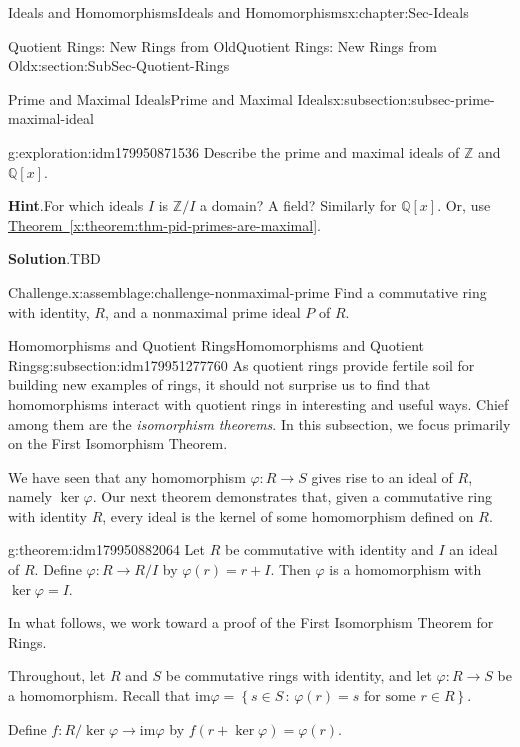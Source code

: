 \documentclass[oneside,10pt,]{book}
\newcommand{\blocktitlefont}{\relax}
\newcommand{\xreffont}{\relax}
\numberwithin{equation}{section}
\def\p{\varphi}
\def\im{\text{im}}
\newcommand{\setof}[2]{{\left\{#1\,\colon\,#2\right\}}}
\def\Z{{\mathbb Z}}
\def\Q{{\mathbb Q}}
\begin{document}
\begin{chapterptx}{Ideals and Homomorphisms}{}{Ideals and Homomorphisms}{}{}{x:chapter:Sec-Ideals}
\begin{sectionptx}{Quotient Rings: New Rings from Old}{}{Quotient Rings: New Rings from Old}{}{}{x:section:SubSec-Quotient-Rings}
\begin{subsectionptx}{Prime and Maximal Ideals}{}{Prime and Maximal Ideals}{}{}{x:subsection:subsec-prime-maximal-ideal}
\begin{exploration}{}{g:exploration:idm179950871536}
Describe the prime and maximal ideals of \(\Z\) and \(\Q[x]\).%
\par\smallskip%
\noindent\textbf{\blocktitlefont Hint}.\hypertarget{g:hint:idm179950870176}{}\quad{}For which ideals \(I\) is \(\Z/I\) a domain? A field? Similarly for \(\Q[x]\). Or, use \hyperref[x:theorem:thm-pid-primes-are-maximal]{Theorem~{\xreffont\ref{x:theorem:thm-pid-primes-are-maximal}}}.\par\smallskip%
\noindent\textbf{\blocktitlefont Solution}.\hypertarget{g:solution:idm179950868144}{}\quad{}TBD\end{exploration}
\begin{assemblage}{Challenge.}{x:assemblage:challenge-nonmaximal-prime}%
Find a commutative ring with identity, \(R\), and a nonmaximal prime ideal \(P\) of \(R\).%
\end{assemblage}
\end{subsectionptx}
%
%
\typeout{************************************************}
\typeout{************************************************}
%
\begin{subsectionptx}{Homomorphisms and Quotient Rings}{}{Homomorphisms and Quotient Rings}{}{}{g:subsection:idm179951277760}
As quotient rings provide fertile soil for building new examples of rings, it should not surprise us to find that homomorphisms interact with quotient rings in interesting and useful ways. Chief among them are the \emph{isomorphism theorems}. In this subsection, we focus primarily on the First Isomorphism Theorem.%
\par
We have seen that any homomorphism \(\p : R\to S\) gives rise to an ideal of \(R\), namely \(\ker\p\). Our next theorem demonstrates that, given a commutative ring with identity \(R\), every ideal is the kernel of some homomorphism defined on \(R\).%
\begin{theorem}{}{}{g:theorem:idm179950882064}%
Let \(R\) be commutative with identity and \(I\) an ideal of \(R\). Define \(\p: R\to R/I\) by \(\p(r) = r+I\). Then \(\p\) is a homomorphism with \(\ker\p = I\).%
\end{theorem}
In what follows, we work toward a proof of the First Isomorphism Theorem for Rings.%
\par
Throughout, let \(R\) and \(S\) be commutative rings with identity, and let \(\p : R\to S\) be a homomorphism. Recall that \(\im \p = \setof{s\in S}{\p(r) = s\text{ for some } r\in R}\).%
\par
Define \(f: R/\ker \p \to \im \p\) by \(f(r+\ker \p) = \p(r)\).%

\end{subsectionptx}
\end{sectionptx}
\end{chapterptx}
\end{document}
